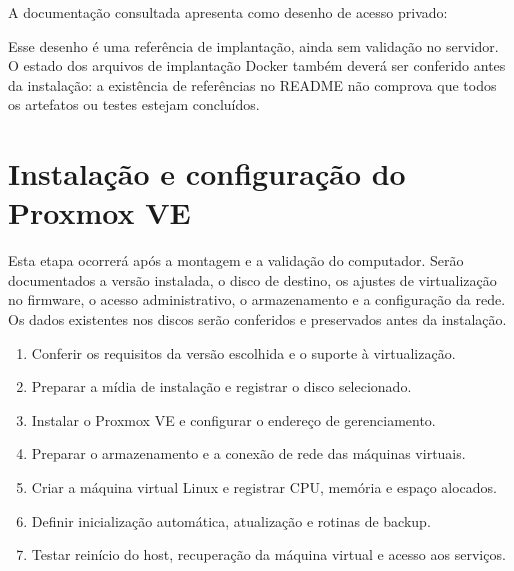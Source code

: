 \documentclass[11pt,a4paper,oneside]{report}
\begin{document}
A documentação consultada apresenta como desenho de acesso privado:
\begin{center}
\end{center}
Esse desenho é uma referência de implantação, ainda sem validação no servidor.
O estado dos arquivos de implantação Docker também deverá ser conferido antes
da instalação: a existência de referências no README não comprova que todos
os artefatos ou testes estejam concluídos.

\section{Instalação e configuração do Proxmox VE}
Esta etapa ocorrerá após a montagem e a validação do computador. Serão
documentados a versão instalada, o disco de destino, os ajustes de virtualização
no firmware, o acesso administrativo, o armazenamento e a configuração da rede.
Os dados existentes nos discos serão conferidos e preservados antes da instalação.

\begin{enumerate}
\item Conferir os requisitos da versão escolhida e o suporte à virtualização.
\item Preparar a mídia de instalação e registrar o disco selecionado.
\item Instalar o Proxmox VE e configurar o endereço de gerenciamento.
\item Preparar o armazenamento e a conexão de rede das máquinas virtuais.
\item Criar a máquina virtual Linux e registrar CPU, memória e espaço alocados.
\item Definir inicialização automática, atualização e rotinas de backup.
\item Testar reinício do host, recuperação da máquina virtual e acesso aos serviços.
\end{enumerate}
\end{document}
